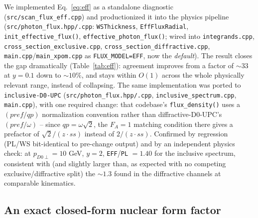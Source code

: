 \documentclass[11pt]{article}
\begin{document}
We implemented Eq.~\eqref{eq:eff} as a standalone diagnostic
(\texttt{src/scan\_flux\_eff.cpp}) and productionized it into the physics
pipeline (\texttt{src/photon\_flux.hpp/.cpp}: \texttt{WSThickness},
\texttt{EffFluxRadial}, \texttt{init\_effective\_flux()},
\texttt{effective\_photon\_flux()}; wired into
\texttt{integrands.cpp}, \texttt{cross\_section\_exclusive.cpp},
\texttt{cross\_section\_diffractive.cpp}, \texttt{main.cpp}/\texttt{main\_xpom.cpp}
as \texttt{FLUX\_MODEL=EFF}, now the \emph{default}). The result closes the
gap dramatically (Table~\ref{tab:eff}): agreement
improves from a factor of $\sim33$ at $y=0.1$ down to $\sim10\%$, and stays
within $O(1)$ across the whole physically relevant range, instead of
collapsing. The same implementation was ported to \texttt{inclusive-D0-UPC}
(\texttt{src/photon\_flux.hpp/.cpp}, \texttt{inclusive\_spectrum.cpp},
\texttt{main.cpp}), with one required change: that codebase's
\texttt{flux\_density()} uses a $(pref/qp)$ normalization convention rather
than diffractive-D0-UPC's $(pref/\omega)$ -- since $qp=\omega\sqrt2$, the
$F_A{=}1$ matching condition there gives a prefactor of $\sqrt2/(z\cdot ss)$
instead of $2/(z\cdot ss)$. Confirmed by regression (PL/WS bit-identical to
pre-change output) and by an independent physics check: at $p_{D0\perp}=10$
GeV, $y=2$, \texttt{EFF}/\texttt{PL} $=1.40$ for the inclusive spectrum,
consistent with (and slightly larger than, as expected with no competing
exclusive/diffractive split) the $\sim1.3$ found in the diffractive
channels at comparable kinematics.

\subsection{An exact closed-form nuclear form factor}
\end{document}
